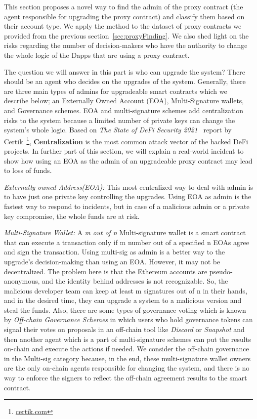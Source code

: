 This section proposes a novel way to find the admin of the proxy contract (the agent responsible for upgrading the proxy contract) and classify them based on their account type. We apply the method to the dataset of proxy contracts we provided from the previous section~\ref{sec:proxyFinding}. We also shed light on the risks regarding the number of decision-makers who have the authority to change the whole logic of the Dapps that are using a proxy contract.

The question we will answer in this part is who can upgrade the system? There should be an agent who decides on the upgrades of the system. Generally, there are three main types of admins for upgradeable smart contracts which we describe below; an Externally Owned Account (EOA), Multi-Signature wallets, and Governance schemes. EOA and multi-signature schemes add centralization risks to the system because a limited number of private keys can change the system's whole logic. Based on \textit{The State of DeFi Security 2021}~\cite{certikReport} report by Certik~\footnote{\url{certik.com}}, \textbf{Centralization} is the most common attack vector of the hacked DeFi projects. In further part of this section, we will explain a real-world incident to show how using an EOA as the admin of an upgradeable proxy contract may lead to loss of funds.

\textit{Externally owned Address(EOA):}
This most centralized way to deal with admin is to have just one private key controlling the upgrades. Using EOA as admin is the fastest way to respond to incidents, but in case of a malicious admin or a private key compromise, the whole funds are at risk.

\textit{Multi-Signature Wallet:}
A \textit{m out of n} Multi-signature wallet is a smart contract that can execute a transaction only if m number out of a specified n EOAs agree and sign the transaction.
Using multi-sig as admin is a better way to the upgrade's decision-making than using an EOA. However, it may not be decentralized. The problem here is that the Ethereum accounts are pseudo-anonymous, and the identity behind addresses is not recognizable. So, the malicious developer team can keep at least m signatures out of n in their hands, and in the desired time, they can upgrade a system to a malicious version and steal the funds.
Also, there are some types of governance voting which is known by \textit{Off-chain Governance Schemes} in which users who hold governance tokens can signal their votes on proposals in an off-chain tool like \textit{Discord} or \textit{Snapshot} and then another agent which is a part of multi-signature schemes can put the results on-chain and execute the actions if needed.
We consider the off-chain governance in the Multi-sig category because, in the end, these multi-signature wallet owners are the only on-chain agents responsible for changing the system, and there is no way to enforce the signers to reflect the off-chain agreement results to the smart contract.


